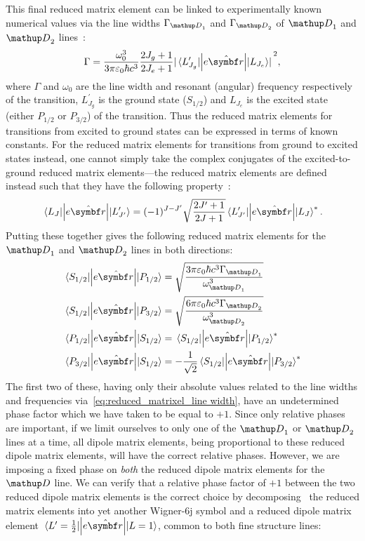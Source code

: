 This final reduced matrix element can be linked to experimentally known numerical values via the line widths $\Gamma_{\up{D}_1}$ and $\Gamma_{\up{D}_2}$ of $\up{D}_1$ and $\up{D}_2$ lines~\cite[eq.~7.3.7.4]{steck_quantum_2017}:
\begin{align}\label{eq:reduced_matrixel_line width}
\Gamma = \frac{\omega_0^3}{3\pi\varepsilon_0\hbar c^3}\frac{2J_g + 1}{2J_e + 1}\abs{\matrixel{L^\prime_{J_g}}{\left|e\hat{\vec r}\right|}{L_{J_e}}}^2,
\end{align}
where $\Gamma$ and $\omega_0$ are the line width and resonant (angular) frequency respectively of the transition, $L^\prime_{J_g}$ is the ground state ($S_{1/2}$) and $L_{J_e}$ is the excited state (either $P_{1/2}$ or ${P_{3/2}}$) of the transition. Thus the reduced matrix elements for transitions from excited to ground states can be expressed in terms of known constants. For the reduced matrix elements for transitions from ground to excited states instead, one cannot simply take the complex conjugates of the excited-to-ground reduced matrix elements---the reduced matrix elements are defined instead such that they have the following property~\cite[eq.~7.3.5.1]{steck_quantum_2017}:
\begin{align}
\matrixel{L_J}{\left|e\hat{\vec r}\right|}{L^\prime_{J^\prime}}
= (-1)^{J - J^\prime}\sqrt{\frac{2J^\prime+1}{2J+1}}
\matrixel{L^\prime_{J^\prime}}{\left|e\hat{\vec r}\right|}{L_J}^*.
\end{align}
Putting these together gives the following reduced matrix elements for the $\up{D}_1$ and $\up{D}_2$ lines in both directions:
\begin{align}
\matrixel{S_{1/2}}{\left|e\hat{\vec r}\right|}{P_{1/2}}
&= \sqrt{\frac{3\pi\varepsilon_0\hbar c^3 \Gamma_{\up{D}_1}}{\omega_{\up{D}_1}^3}}\\
\matrixel{S_{1/2}}{\left|e\hat{\vec r}\right|}{P_{3/2}}
&= \sqrt{\frac{6\pi\varepsilon_0\hbar c^3 \Gamma_{\up{D}_2}}{\omega_{\up{D}_2}^3}}\\
\matrixel{P_{1/2}}{\left|e\hat{\vec r}\right|}{S_{1/2}}
&= \matrixel{S_{1/2}}{\left|e\hat{\vec r}\right|}{P_{1/2}}^*\\
\matrixel{P_{3/2}}{\left|e\hat{\vec r}\right|}{S_{1/2}}
&= -\frac1{\sqrt2}\matrixel{S_{1/2}}{\left|e\hat{\vec r}\right|}{P_{3/2}}^*
\end{align}
The first two of these, having only their absolute values related to the line widths and frequencies via~\eqref{eq:reduced_matrixel_line width}, have an undetermined phase factor which we have taken to be equal to $+1$. Since only relative phases are important, if we limit ourselves to only one of the $\up{D}_1$ or $\up{D}_2$ lines at a time, all dipole matrix elements, being proportional to these reduced dipole matrix elements, will have the correct relative phases. However, we are imposing a fixed phase on \emph{both} the reduced dipole matrix elements for the $\up{D}$ line. We can verify that a relative phase factor of $+1$ between the two reduced dipole matrix elements is the correct choice by decomposing~\cite{steck_rubidium_2015} the reduced matrix elements into yet another Wigner-6j symbol and a reduced dipole matrix element $\matrixel{L^\prime=\frac12}{\left|e\hat{\vec r}\right|}{L=1}$, common to both fine structure lines:
